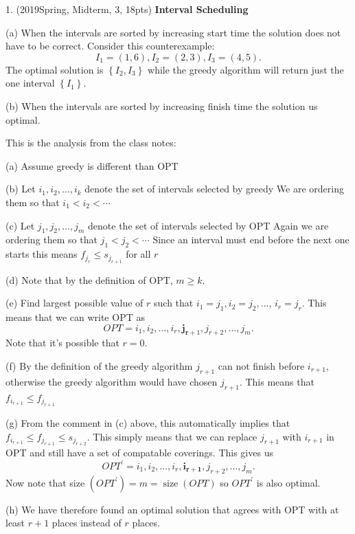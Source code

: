 \begin{spacing}{1.3}
    1. (2019Spring, Midterm, 3, 18pts) {\bf Interval Scheduling} 

    (a) When the intervals are sorted by increasing start time the solution does not have to be correct. Consider this counterexample:
    $$
    I_{1}=(1,6), I_{2}=(2,3), I_{3}=(4,5).
    $$
    The optimal solution is $\left\{I_{2}, I_{3}\right\}$ while the greedy algorithm will return just the one interval $\left\{I_{1}\right\}$.
    
    (b) When the intervals are sorted by increasing finish time the solution us optimal.
    
    This is the analysis from the class notes:
    
    \setlength{\parindent}{2em}

    (a) Assume greedy is different than OPT
    
    (b) Let $i_{1}, i_{2}, \ldots, i_{k}$ denote the set of intervals selected by greedy We are ordering them so that $i_{1}<i_{2}<\cdots$
    
    (c) Let $j_{1}, j_{2}, \ldots, j_{m}$ denote the set of intervals selected by OPT Again we are ordering them so that $j_{1}<j_{2}<\cdots$
    Since an interval must end before the next one starts this means $f_{j_{r}} \leq s_{j_{r+1}}$ for all $r$
    
    (d) Note that by the definition of OPT, $m \geq k$.
    
    (e) Find largest possible value of $r$ such that $i_{1}=j_{1}, i_{2}=j_{2}, \ldots$, $i_{r}=j_{r}$.
    This means that we can write OPT as
    $$
    O P T=i_{1}, i_{2}, \ldots, i_{r}, \mathbf{j}_{\mathbf{r}+1}, j_{r+2}, \ldots, j_{m} .
    $$
    Note that it's possible that $r=0$.
    
    (f) By the definition of the greedy algorithm $j_{r+1}$ can not finish before $i_{r+1}$, otherwise the greedy algorithm would have chosen $j_{r+1}$. This means that $f_{i_{r+1}} \leq f_{j_{r+1}}$
    
    (g) From the comment in (c) above, this automatically implies that $f_{i_{r+1}} \leq f_{j_{r+1}} \leq s_{j_{r+2}}$.
    This simply means that we can replace $j_{r+1}$ with $i_{r+1}$ in OPT and still have a set of compatable coverings. This gives us
    $$
    O P T^{\prime}=i_{1}, i_{2}, \ldots, i_{r}, \mathbf{i}_{\mathbf{r}+\mathbf{1}}, j_{r+2}, \ldots, j_{m} .
    $$
    Now note that size $\left(O P T^{\prime}\right)=m=\operatorname{size}(O P T)$ so $O P T^{\prime}$ is also optimal.
    
    (h) We have therefore found an optimal solution that agrees with OPT with at least $r+1$ places instead of $r$ places.
    

\end{spacing}
